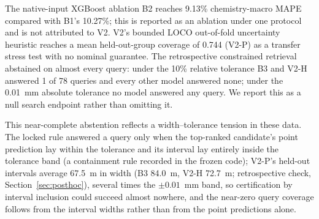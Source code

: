 \documentclass[11pt,a4paper]{article}
\newcommand{\um}{\textmu m}
\newcommand{\tox}{TX100}
\begin{document}
The native-input XGBoost ablation B2 reaches 9.13\% chemistry-macro MAPE
compared with B1's 10.27\%; this is reported as an ablation under one protocol and
is not attributed to V2. V2's bounded LOCO out-of-fold uncertainty heuristic
reaches a mean held-out-group coverage of 0.744 (V2-P) as a transfer stress
test with no nominal guarantee. The retrospective constrained retrieval
abstained on almost every query: under the 10\% relative tolerance B3 and V2-H
answered 1 of 78 queries and every other model answered none; under the
0.01~mm absolute tolerance no model answered any query. We report this as a
null search endpoint rather than omitting it.

This near-complete abstention reflects a
width--tolerance tension in these data. The locked rule answered a query only
when the top-ranked candidate's point prediction lay within the tolerance and
its interval lay entirely inside the tolerance band (a containment rule
recorded in the frozen code); V2-P's held-out intervals average 67.5~\um{} in
width (B3 84.0~\um, V2-H 72.7~\um; retrospective check,
Section~\ref{sec:posthoc}), several times the $\pm 0.01$~mm band, so
certification by interval inclusion could succeed almost nowhere, and the
near-zero query coverage follows from the interval widths rather than from the
point predictions alone.

\begin{table}[t]
\centering\small
\caption{Frozen V2 model matrix under nested leave-one-chemistry-out
evaluation (466 rows, six groups, five seeds; \tox{} is post-reveal
retrospective).}
\label{tab:v2}
\end{table}
\end{document}
